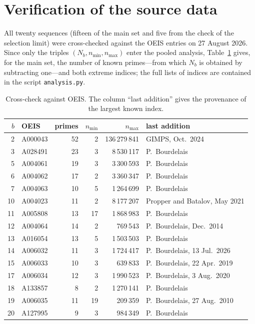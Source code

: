 \documentclass[11pt,a4paper]{article}
\theoremstyle{plain}
\theoremstyle{remark}
\begin{document}
\appendix
\section{Verification of the source data}\label{app:data}

All twenty sequences (fifteen of the main set and five from the check of the
selection limit) were cross-checked against the OEIS entries on 27 August 2026.
Since only the triples $(N_b,n_{\min},n_{\max})$ enter the pooled analysis,
Table~\ref{tab:verify} gives, for the main set, the number of known primes---from
which $N_b$ is obtained by subtracting one---and both extreme indices; the full
lists of indices are contained in the script \texttt{analysis.py}.

\begin{table}[h]
\centering
\caption{Cross-check against OEIS. The column ``last addition'' gives the
provenance of the largest known index.}
\label{tab:verify}
\small
\begin{tabular}{rlrrrl}
\toprule
$b$ & OEIS & primes & $n_{\min}$ & $n_{\max}$ & last addition\\
\midrule
2 & A000043 & 52 & 2 & 136\,279\,841 & GIMPS, Oct.\ 2024\\
3 & A028491 & 23 & 3 & 8\,530\,117 & P.~Bourdelais\\
5 & A004061 & 19 & 3 & 3\,300\,593 & P.~Bourdelais\\
6 & A004062 & 17 & 2 & 3\,360\,347 & P.~Bourdelais\\
7 & A004063 & 10 & 5 & 1\,264\,699 & P.~Bourdelais\\
10 & A004023 & 11 & 2 & 8\,177\,207 & Propper and Batalov, May 2021\\
11 & A005808 & 13 & 17 & 1\,868\,983 & P.~Bourdelais\\
12 & A004064 & 14 & 2 & 769\,543 & P.~Bourdelais, Dec.\ 2014\\
13 & A016054 & 13 & 5 & 1\,503\,503 & P.~Bourdelais\\
14 & A006032 & 11 & 3 & 1\,724\,417 & P.~Bourdelais, 13 Jul.\ 2026\\
15 & A006033 & 10 & 3 & 639\,833 & P.~Bourdelais, 22 Apr.\ 2019\\
17 & A006034 & 12 & 3 & 1\,990\,523 & P.~Bourdelais, 3 Aug.\ 2020\\
18 & A133857 & 8 & 2 & 1\,270\,141 & P.~Bourdelais\\
19 & A006035 & 11 & 19 & 209\,359 & P.~Bourdelais, 27 Aug.\ 2010\\
20 & A127995 & 9 & 3 & 984\,349 & P.~Bourdelais\\
\bottomrule
\end{tabular}
\end{table}
\end{document}

